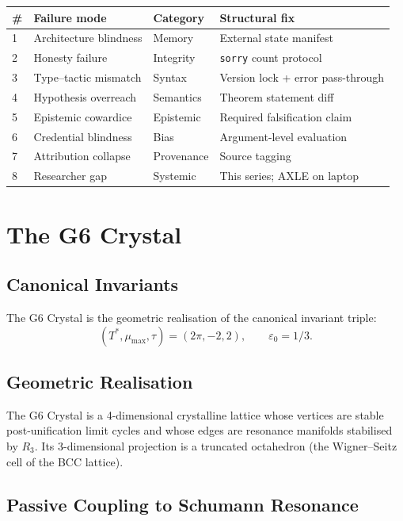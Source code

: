 \documentclass[11pt, twoside, openright]{book}
\theoremstyle{plain}
\theoremstyle{definition}
\newcommand{\eps}{\varepsilon_0}
\begin{document}
\bigskip
\begin{tabularx}{\textwidth}{@{}P{0.5cm}P{3.2cm}P{2.8cm}L@{}}
\toprule
\textbf{\#} & \textbf{Failure mode} & \textbf{Category} &
\textbf{Structural fix} \\
 & Architecture blindness & Memory    & External state manifest \\
2 & Honesty failure        & Integrity & \texttt{sorry} count protocol \\
3 & Type--tactic mismatch  & Syntax    & Version lock + error pass-through \\
4 & Hypothesis overreach   & Semantics & Theorem statement diff \\
5 & Epistemic cowardice    & Epistemic & Required falsification claim \\
6 & Credential blindness   & Bias      & Argument-level evaluation \\
7 & Attribution collapse   & Provenance& Source tagging \\
8 & Researcher gap         & Systemic  & This series; AXLE on laptop \\
\bottomrule
\end{tabularx}

\chapter{The G6 Crystal}

\section{Canonical Invariants}

The G6 Crystal is the geometric realisation of the canonical invariant
triple:
\[
(T^*, \mu_{\max}, \tau) = (2\pi, -2, 2), \qquad \eps = 1/3.
\]

\section{Geometric Realisation}

The G6 Crystal is a 4-dimensional crystalline lattice whose vertices
are stable post-unification limit cycles and whose edges are resonance
manifolds stabilised by $R_3$. Its 3-dimensional projection is a
truncated octahedron (the Wigner--Seitz cell of the BCC lattice).

\section{Passive Coupling to Schumann Resonance}
\end{document}
